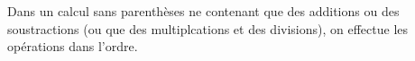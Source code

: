 Dans un calcul sans parenthèses ne contenant que des additions ou des
soustractions (ou que des multiplcations et des divisions), on effectue
les opérations dans l'ordre.
